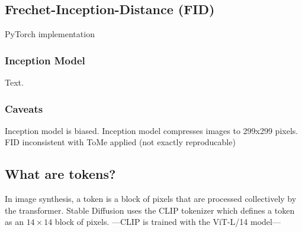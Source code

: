 \subsection{Frechet-Inception-Distance (FID)}
PyTorch implementation\cite{Seitzer2020FID}



\subsubsection{Inception Model}
Text.




\subsubsection{Caveats}
Inception model is biased. Inception model compresses images to 299x299 pixels. FID inconsistent with ToMe applied (not exactly reproducable)



\subsection{What are tokens?}
In image synthesis, a token is a block of pixels that are processed collectively by the transformer. Stable Diffusion uses the CLIP tokenizer \cite{radford2021learning} which defines a token as an $14 \times 14$ block of pixels. ---CLIP is trained with the ViT-L/14 model---